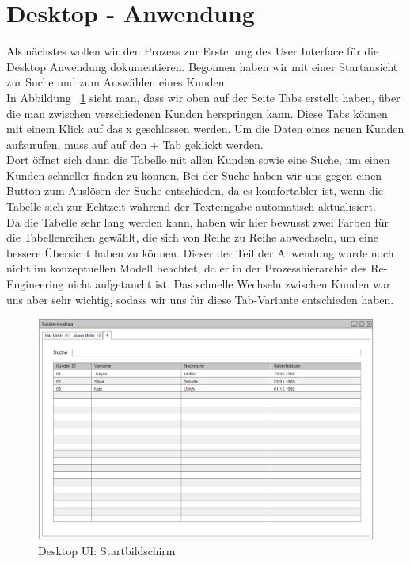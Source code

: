 \section{Desktop - Anwendung}

Als nächstes wollen wir den Prozess zur Erstellung des User Interface für die Desktop Anwendung dokumentieren. Begonnen haben wir mit einer Startansicht zur Suche und zum Auswählen eines Kunden. \\
In Abbildung ~\ref{desktopUI:1} sieht man, dass wir oben auf der Seite Tabs erstellt haben, über die man zwischen verschiedenen Kunden herspringen kann. Diese Tabs können mit einem Klick auf das x geschlossen werden. Um die Daten eines neuen Kunden aufzurufen, muss auf auf den + Tab geklickt werden. 
\\Dort öffnet sich dann die Tabelle mit allen Kunden sowie eine Suche, um einen Kunden schneller finden zu können. Bei der Suche haben wir uns gegen einen Button zum Auslösen der Suche entschieden, da es komfortabler ist, wenn die Tabelle sich zur Echtzeit während der Texteingabe automatisch aktualisiert. 
\\Da die Tabelle sehr lang werden kann, haben wir hier bewusst zwei Farben für die Tabellenreihen gewählt, die sich von Reihe zu Reihe abwechseln, um eine bessere Übersicht haben zu können. Dieser der Teil der Anwendung wurde noch nicht im konzeptuellen Modell beachtet, da er in der Prozesshierarchie des Re-Engineering nicht aufgetaucht ist. Das schnelle Wechseln zwischen Kunden war uns aber sehr wichtig, sodass wir uns für diese Tab-Variante entschieden haben.

\begin{figure}[ht!]
\centering
\includegraphics[width=\linewidth]{1Startbildschirm}
\caption{Desktop UI: Startbildschirm}
\label{desktopUI:1}
\end{figure}

